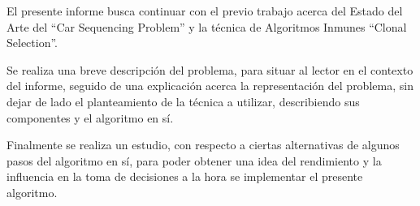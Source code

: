 
El presente informe busca continuar con el previo trabajo
acerca del Estado del Arte del ``Car Sequencing Problem''
y la técnica de Algoritmos Inmunes ``Clonal Selection''.

Se realiza una breve descripción del problema,
para situar al lector en el contexto del informe,
seguido de una explicación acerca la representación del problema,
sin dejar de lado el planteamiento de la técnica a utilizar,
describiendo sus componentes y el algoritmo en sí.

Finalmente se realiza un estudio,
con respecto a ciertas alternativas de algunos
pasos del algoritmo en sí, para poder obtener
una idea del rendimiento y la influencia en la toma de decisiones
a la hora se implementar el presente algoritmo.
